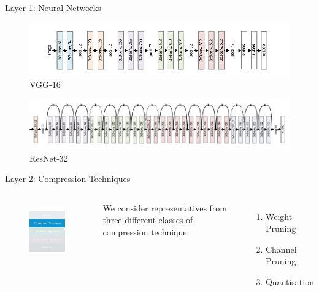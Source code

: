 \documentclass[xcolor=dvipsnames]{beamer}
\begin{document}
\begin{frame}{Layer 1: Neural Networks}
\vspace{0.2cm}

\begin{figure}
    \centering
    \includegraphics[width=0.8\linewidth]{images/vgg.pdf}
    \caption{VGG-16}
\end{figure}


\begin{figure}
    \centering
    \includegraphics[width=0.8\linewidth]{images/resnet.pdf}
    \caption{ResNet-32}
\end{figure}

\end{frame}


\begin{frame}{Layer 2: Compression Techniques}

\begin{columns}
\begin{figure}
    \centering
    \includegraphics[width=3.5cm]{images/compressions.pdf}
    \label{fig:inference-stack-compress-1}
\end{figure}

We consider representatives from three different classes of compression technique:
\begin{enumerate}
    \item Weight Pruning
    \item Channel Pruning
    \item Quantisation
\end{enumerate}


\end{columns}

\end{frame}
\end{document}
